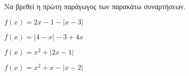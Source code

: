 Να βρεθεί η πρώτη παράγωγος των παρακάτω συναρτήσεων.
\begin{multicols}{2}
\begin{alist}
\item $ f(x)=2x-1-|x-3| $
\item $ f(x)=|4-x|-3+4x $
\item $ f(x)=x^2+|2x-1| $
\item $ f(x)=x^2+x-|x-2| $
\end{alist}
\end{multicols}
